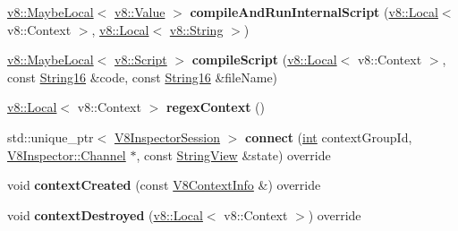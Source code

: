 \begin{DoxyCompactItemize}
\mbox{\hyperlink{classv8_1_1MaybeLocal}{v8\+::\+Maybe\+Local}}$<$ \mbox{\hyperlink{classv8_1_1Value}{v8\+::\+Value}} $>$ {\bfseries compile\+And\+Run\+Internal\+Script} (\mbox{\hyperlink{classv8_1_1Local}{v8\+::\+Local}}$<$ v8\+::\+Context $>$, \mbox{\hyperlink{classv8_1_1Local}{v8\+::\+Local}}$<$ \mbox{\hyperlink{classv8_1_1String}{v8\+::\+String}} $>$)
\item 
\mbox{\label{classv8__inspector_1_1V8InspectorImpl_a2b2a60ab13f7efb102dd97fed07cde75}} 
\mbox{\hyperlink{classv8_1_1MaybeLocal}{v8\+::\+Maybe\+Local}}$<$ \mbox{\hyperlink{classv8_1_1Script}{v8\+::\+Script}} $>$ {\bfseries compile\+Script} (\mbox{\hyperlink{classv8_1_1Local}{v8\+::\+Local}}$<$ v8\+::\+Context $>$, const \mbox{\hyperlink{classv8__inspector_1_1String16}{String16}} \&code, const \mbox{\hyperlink{classv8__inspector_1_1String16}{String16}} \&file\+Name)
\item 
\mbox{\label{classv8__inspector_1_1V8InspectorImpl_a2a17633c8ee0a0cfb147cb79637371cb}} 
\mbox{\hyperlink{classv8_1_1Local}{v8\+::\+Local}}$<$ v8\+::\+Context $>$ {\bfseries regex\+Context} ()
\item 
\mbox{\label{classv8__inspector_1_1V8InspectorImpl_a62ce55a8df4cbbffbe39c4500d462458}} 
std\+::unique\+\_\+ptr$<$ \mbox{\hyperlink{classv8__inspector_1_1V8InspectorSession}{V8\+Inspector\+Session}} $>$ {\bfseries connect} (\mbox{\hyperlink{classint}{int}} context\+Group\+Id, \mbox{\hyperlink{classv8__inspector_1_1V8Inspector_1_1Channel}{V8\+Inspector\+::\+Channel}} $\ast$, const \mbox{\hyperlink{classv8__inspector_1_1StringView}{String\+View}} \&state) override
\item 
\mbox{\label{classv8__inspector_1_1V8InspectorImpl_a576ed397243cf8e0068db83260a05e3b}} 
void {\bfseries context\+Created} (const \mbox{\hyperlink{classv8__inspector_1_1V8ContextInfo}{V8\+Context\+Info}} \&) override
\item 
\mbox{\label{classv8__inspector_1_1V8InspectorImpl_ad77604a25ad48215cc0a138a3ddd1f1a}} 
void {\bfseries context\+Destroyed} (\mbox{\hyperlink{classv8_1_1Local}{v8\+::\+Local}}$<$ v8\+::\+Context $>$) override
\item 

\end{DoxyCompactItemize}
